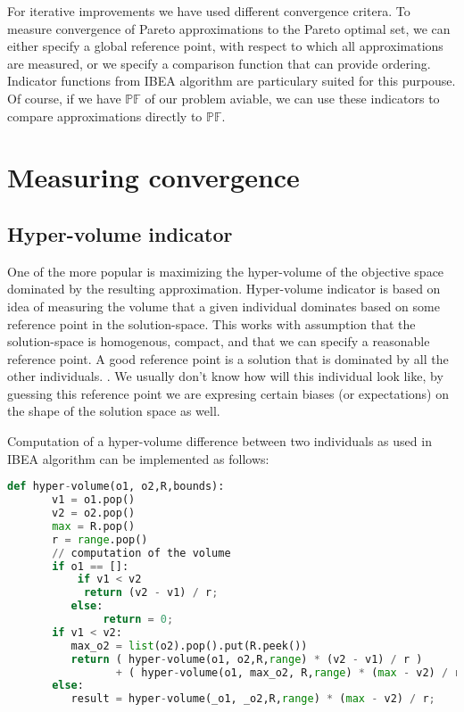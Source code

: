 \documentclass[12pt,oneside]{fithesis2}
\begin{document}
For iterative improvements we have used different convergence critera. To measure convergence of Pareto approximations to the Pareto optimal set, we can either specify a global reference point, with respect to which all approximations are measured, or we specify a comparison function that can provide ordering. Indicator functions from IBEA algorithm are particulary suited for this purpouse. Of course, if we have $\mathbb{PF}$ of our problem aviable, we can use these indicators to compare approximations directly to $\mathbb{PF}$.

\section{Measuring convergence}

\subsection{Hyper-volume indicator}
One of the more popular is maximizing the hyper-volume of the objective space dominated by the resulting approximation. Hyper-volume indicator is based on idea of measuring the volume that a given individual dominates based on some reference point in the solution-space. This works with assumption that the solution-space is homogenous, compact, and that we can specify a reasonable reference point. A good reference point is a solution that is dominated by all the other individuals. \cite{auger2009theory}. We usually don't know how will this individual look like, by guessing this reference point we are expresing certain biases (or expectations) on the shape of the solution space as well.

Computation of a hyper-volume difference between two individuals as used in IBEA algorithm can be implemented as follows:
\begin{lstlisting}[language=Python,label=hv_example,caption=Hyper-volume implementation]
def hyper-volume(o1, o2,R,bounds):
       v1 = o1.pop()
       v2 = o2.pop()
       max = R.pop()
       r = range.pop()
       // computation of the volume
       if o1 == []:
           if v1 < v2
            return (v2 - v1) / r;
          else:
               return = 0;
       if v1 < v2:
          max_o2 = list(o2).pop().put(R.peek())
          return ( hyper-volume(o1, o2,R,range) * (v2 - v1) / r ) 
                 + ( hyper-volume(o1, max_o2, R,range) * (max - v2) / r );
       else:
          result = hyper-volume(_o1, _o2,R,range) * (max - v2) / r;
\end{lstlisting}
\end{document}
